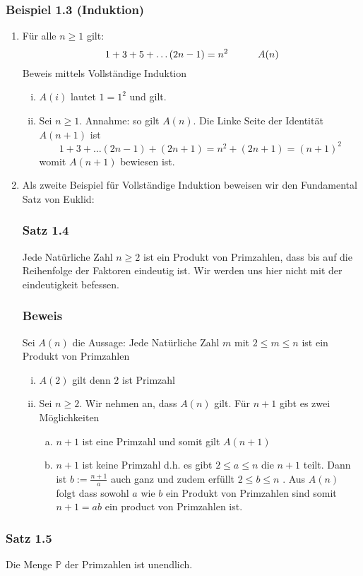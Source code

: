 \subsubsection*{Beispiel 1.3 (Induktion)}
\begin{enumerate}
\item Für alle $n\geq 1$ gilt: \[1+3+5+\dots (2n-1)=n^2\text{\indent\indent}A(n)\] Beweis mittels Vollständige Induktion
\begin{enumerate}[i)]
\item $A(i)$ lautet $1=1^2$ und gilt.
\item Sei $n\geq 1$. Annahme: so gilt $A(n)$. Die Linke Seite der Identität $A(n+1)$ ist \[1+3+\dots (2n-1)+(2n+1)=n^{2}+(2n+1)=(n+1)^2\] womit $A(n+1)$ bewiesen ist.
\end{enumerate}
\item Als zweite Beispiel für Vollständige Induktion beweisen wir den Fundamental Satz von Euklid:
\subsubsection*{Satz 1.4}
Jede Natürliche Zahl $n\geq 2$ ist ein Produkt von Primzahlen, dass bis auf die Reihenfolge der Faktoren eindeutig ist. Wir werden uns hier nicht mit der eindeutigkeit befessen.
\subsubsection*{Beweis}
Sei $A(n)$ die Aussage: Jede Natürliche Zahl $m$ mit $2\leq m\leq n$ ist ein Produkt von Primzahlen
\begin{enumerate}[i)]
\item $A(2)$ gilt denn $2$ ist Primzahl
\item Sei $n\geq 2$. Wir nehmen an, dass $A(n)$ gilt. Für $n+1$ gibt es zwei Möglichkeiten
\begin{enumerate}[a)]
\item $n+1$ ist eine Primzahl und somit gilt $A(n+1)$ 
\item $n+1$ ist keine Primzahl d.h. es gibt $2\leq a\leq n$ die $n+1$ teilt. Dann ist $b:=\frac{n+1}{a}$ auch ganz und zudem erfüllt $2\leq b\leq n$ . Aus $A(n)$ folgt dass sowohl $a$ wie $b$ ein Produkt von Primzahlen sind somit $n+1=ab$ ein product von Primzahlen ist. 
\end{enumerate}
\end{enumerate}
\end{enumerate}
\subsubsection*{Satz 1.5}
Die Menge $\mathbb{P}$ der Primzahlen ist unendlich.
